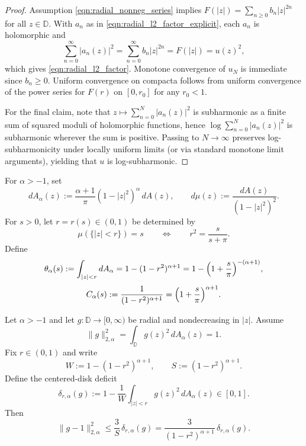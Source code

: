 \documentclass[a4paper,10pt]{amsart}
\newcommand{\D}{\mathbb{D}}
\begin{document}
\begin{proof}
Assumption \eqref{eqn:radial_nonneg_series} implies $F(|z|)=\sum_{n\ge 0} b_n |z|^{2n}$ for all $z\in\mathbb D$.
With $a_n$ as in \eqref{eqn:radial_l2_factor_explicit}, each $a_n$ is holomorphic and
\[
\sum_{n=0}^\infty |a_n(z)|^2=\sum_{n=0}^\infty b_n |z|^{2n}=F(|z|)=u(z)^2,
\]
which gives \eqref{eqn:radial_l2_factor}. Monotone convergence of $u_N$ is immediate since $b_n\ge 0$.
Uniform convergence on compacta follows from uniform convergence of the power series for $F(r)$ on $[0,r_0]$ for any $r_0<1$.

For the final claim, note that $z\mapsto \sum_{n=0}^N |a_n(z)|^2$ is subharmonic as a finite sum of squared moduli of holomorphic functions, hence $\log \sum_{n=0}^N |a_n(z)|^2$ is subharmonic wherever the sum is positive. Passing to $N\to\infty$ preserves log-subharmonicity under locally uniform limits (or via standard monotone limit arguments), yielding that $u$ is log-subharmonic.
\end{proof}







For $\alpha>-1$, set
\[
dA_\alpha(z):=\frac{\alpha+1}{\pi}(1-|z|^2)^\alpha\,dA(z),
\qquad
d\mu(z):=\frac{dA(z)}{(1-|z|^2)^2}.
\]
For $s>0$, let $r=r(s)\in(0,1)$ be determined by
\[
\mu(\{|z|<r\})=s
\qquad\Longleftrightarrow\qquad
r^2=\frac{s}{s+\pi}.
\]
Define
\[
\theta_\alpha(s):=\int_{|z|<r} dA_\alpha
=1-(1-r^2)^{\alpha+1}
=1-\Bigl(1+\frac{s}{\pi}\Bigr)^{-(\alpha+1)},
\]
\[
C_\alpha(s):=\frac{1}{(1-r^2)^{\alpha+1}}
=\Bigl(1+\frac{s}{\pi}\Bigr)^{\alpha+1}.
\]


\begin{numlemma}
\label{lem:centered_disk_radial}
Let $\alpha>-1$ and let $g:\D\to[0,\infty)$ be radial and nondecreasing in $|z|$.
Assume
\[
\|g\|_{2,\alpha}^2=\int_{\D} g(z)^2\,dA_\alpha(z)=1.
\]
Fix $r\in(0,1)$ and write
\[
W:=1-(1-r^2)^{\alpha+1},
\qquad
S:=(1-r^2)^{\alpha+1}.
\]
Define the centered-disk deficit
\[
\delta_{r,\alpha}(g)
:=1-\frac{1}{W}\int_{|z|<r} g(z)^2\,dA_\alpha(z)\in[0,1].
\]
Then
\[
\|g-1\|_{2,\alpha}^2
\le \frac{3}{S}\,\delta_{r,\alpha}(g)
=\frac{3}{(1-r^2)^{\alpha+1}}\,\delta_{r,\alpha}(g).
\]
\end{numlemma}
\end{document}
